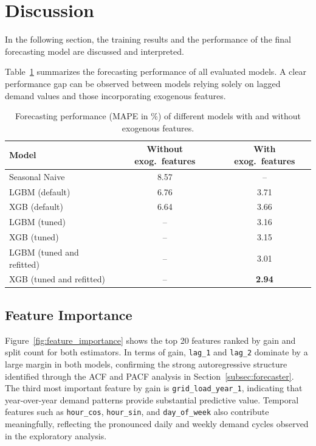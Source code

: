 \section{Discussion}
\label{sec:discussion}
In the following section, the training results and the performance of the final forecasting model are discussed and interpreted.

Table~\ref{tab:mape_comparison} summarizes the forecasting performance of all evaluated models. A clear performance gap can be observed between models relying solely on lagged demand values and those incorporating exogenous features.
\begin{table}[H]
    \centering
    \caption[Forecasting performance of different models]{Forecasting performance (\acs{MAPE} in \%) of different models with and without exogenous features.}
    \label{tab:mape_comparison}
    \begin{tabular}{lcc}
        \toprule
        \textbf{Model} & \textbf{Without exog.\ features} & \textbf{With exog.\ features} \\
        \midrule
        Seasonal Naive & 8.57 & -- \\
        \ac{LGBM} (default) & 6.76 & 3.71 \\
        \ac{XGB} (default) & 6.64 & 3.66  \\
        \ac{LGBM} (tuned)   & --  & 3.16 \\
        \ac{XGB} (tuned)   & --  & 3.15 \\
        \ac{LGBM} (tuned and refitted)   & --  & 3.01 \\
        \ac{XGB} (tuned and refitted)   & --  & \textbf{2.94} \\
    \bottomrule
\end{tabular}
\end{table}

\subsection{Feature Importance}
\label{subsec:feature_importance}
Figure~\ref{fig:feature_importance} shows the top 20 features ranked by gain and split count for both estimators. In terms of gain, \texttt{lag\_1} and \texttt{lag\_2} dominate by a large margin in both models, confirming the strong autoregressive structure identified through the \ac{ACF} and \ac{PACF} analysis in Section~\ref{subsec:forecaster}. The third most important feature by gain is \texttt{grid\_load\_year\_1}, indicating that year-over-year demand patterns provide substantial predictive value. Temporal features such as \texttt{hour\_cos}, \texttt{hour\_sin}, and \texttt{day\_of\_week} also contribute meaningfully, reflecting the pronounced daily and weekly demand cycles observed in the exploratory analysis.


